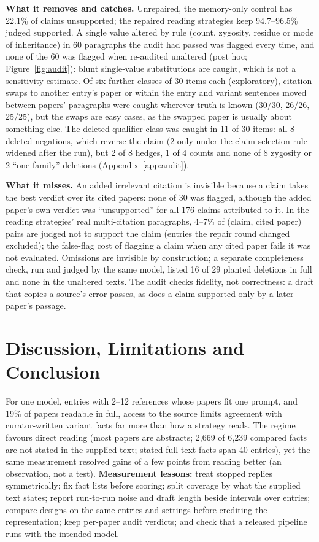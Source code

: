 \documentclass{article} %
\begin{document}
\textbf{What it removes and catches.} Unrepaired, the memory-only control has 22.1\% of claims unsupported; the repaired reading strategies keep 94.7--96.5\% judged supported. A single value altered by rule (count, zygosity, residue or mode of inheritance) in 60 paragraphs the audit had passed was flagged every time, and none of the 60 was flagged when re-audited unaltered (post hoc; Figure~\ref{fig:audit}): blunt single-value substitutions are caught, which is not a sensitivity estimate. Of six further classes of 30 items each (exploratory), citation swaps to another entry's paper or within the entry and variant sentences moved between papers' paragraphs were caught wherever truth is known (30/30, 26/26, 25/25), but the swaps are easy cases, as the swapped paper is usually about something else. The deleted-qualifier class was caught in 11 of 30 items: all 8 deleted negations, which reverse the claim (2 only under the claim-selection rule widened after the run), but 2 of 8 hedges, 1 of 4 counts and none of 8 zygosity or 2 ``one family'' deletions (Appendix~\ref{app:audit}).

\textbf{What it misses.} An added irrelevant citation is invisible because a claim takes the best verdict over its cited papers: none of 30 was flagged, although the added paper's own verdict was ``unsupported'' for all 176 claims attributed to it. In the reading strategies' real multi-citation paragraphs, 4--7\% of (claim, cited paper) pairs are judged not to support the claim (entries the repair round changed excluded); the false-flag cost of flagging a claim when any cited paper fails it was not evaluated. Omissions are invisible by construction; a separate completeness check, run and judged by the same model, listed 16 of 29 planted deletions in full and none in the unaltered texts. The audit checks fidelity, not correctness: a draft that copies a source's error passes, as does a claim supported only by a later paper's passage.

\section{Discussion, Limitations and Conclusion}
\label{sec:discussion}
For one model, entries with 2--12 references whose papers fit one prompt, and 19\% of papers readable in full, access to the source limits agreement with curator-written variant facts far more than how a strategy reads. The regime favours direct reading (most papers are abstracts; 2,669 of 6,239 compared facts are not stated in the supplied text; stated full-text facts span 40 entries), yet the same measurement resolved gains of a few points from reading better (an observation, not a test). \textbf{Measurement lessons:} treat stopped replies symmetrically; fix fact lists before scoring; split coverage by what the supplied text states; report run-to-run noise and draft length beside intervals over entries; compare designs on the same entries and settings before crediting the representation; keep per-paper audit verdicts; and check that a released pipeline runs with the intended model.
\end{document}
